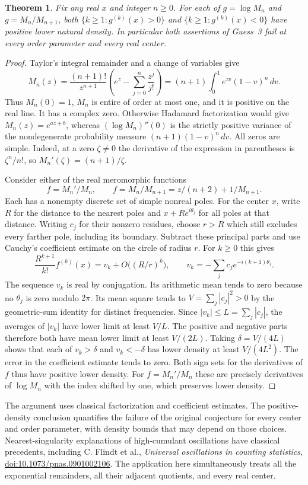 \documentclass[11pt,a4paper]{article}
\newtheorem{theorem}{Theorem}[section]
\numberwithin{equation}{section}
\begin{document}
\begin{theorem}\label{th:exp-remainders}
Fix any real $x$ and integer $n\ge0$. For each of
$g=\log M_n$ and $g=M_n/M_{n+1}$, both
$\{k\ge1:g^{(k)}(x)>0\}$ and $\{k\ge1:g^{(k)}(x)<0\}$
have positive lower natural density. In particular both assertions
of Guess~3 fail at every order parameter and every real center.
\end{theorem}
\begin{proof}
Taylor's integral remainder and a change of variables give
\[
 M_n(z)=\frac{(n+1)!}{z^{n+1}}
       \left(e^z-\sum_{j=0}^n\frac{z^j}{j!}\right)
       =(n+1)\int_0^1e^{zv}(1-v)^n\,dv.
\]
Thus $M_n(0)=1$, $M_n$ is entire of order at most one, and it is
positive on the real line. It has a complex zero. Otherwise
Hadamard factorization would give $M_n(z)=e^{az+b}$, whereas
$(\log M_n)''(0)$ is the strictly positive variance of the
nondegenerate probability measure $(n+1)(1-v)^n\,dv$.
All zeros are simple. Indeed, at a zero $\zeta\ne0$ the derivative
of the expression in parentheses is $\zeta^n/n!$, so
$M_n'(\zeta)=(n+1)/\zeta$.

Consider either of the real meromorphic functions
\[
 f=M_n'/M_n,\qquad
 f=M_n/M_{n+1}=z/(n+2)+1/M_{n+1}.
\]
Each has a nonempty discrete set of simple nonreal poles. For the center
$x$, write $R$ for the distance to the nearest poles and
$x+R e^{i\theta_j}$ for all poles at that distance.
Writing $c_j$ for their nonzero residues, choose $r>R$ which still
excludes every farther pole, including its boundary. Subtract these
principal parts and use Cauchy's coefficient estimate on the circle
of radius $r$. For $k\ge0$ this gives
\[
 \frac{R^{k+1}}{k!} f^{(k)}(x)
  =v_k+O\bigl((R/r)^k\bigr),\qquad
 v_k=-\sum_j c_j e^{-i(k+1)\theta_j}.
\]
The sequence $v_k$ is real by conjugation. Its arithmetic mean tends to zero
because no $\theta_j$ is zero modulo $2\pi$. Its mean square tends to
$V=\sum_j|c_j|^2>0$ by the geometric-sum identity for distinct
frequencies. Since $|v_k|\le L=\sum_j|c_j|$, the averages
of $|v_k|$ have lower limit at least $V/L$. The positive and negative
parts therefore both have mean lower limit at least $V/(2L)$.
Taking $\delta=V/(4L)$ shows that each of $v_k>\delta$ and
$v_k<-\delta$ has lower density at least $V/(4L^2)$. The error in
the coefficient estimate tends to zero. Both sign sets for the
derivatives of $f$ thus have positive lower density. For $f=M_n'/M_n$
these are precisely derivatives of $\log M_n$ with the index shifted
by one, which preserves lower density.
\end{proof}
The argument uses classical factorization and coefficient estimates.
The positive-density conclusion quantifies the failure of the original
conjecture for every center and order parameter, with
density bounds that may depend on those choices.
Nearest-singularity explanations of high-cumulant oscillations have
classical precedents, including C. Flindt et al., \emph{Universal
oscillations in counting statistics},
\href{https://doi.org/10.1073/pnas.0901002106}{doi:10.1073/pnas.0901002106}.
The application here simultaneously treats all the exponential
remainders, all their adjacent quotients, and every real center.
\end{document}
